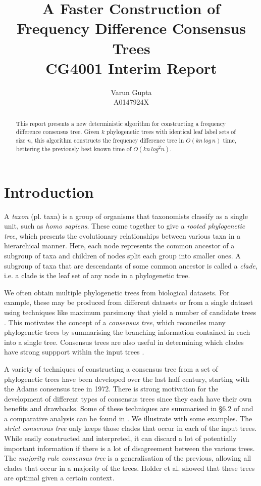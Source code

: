 \documentclass{article}
\title{A Faster Construction of Frequency Difference Consensus Trees\\CG4001 Interim Report}
\author{Varun Gupta\\A0147924X}
\begin{document}
    \maketitle

    \begin{abstract}
        This report presents a new deterministic algorithm for constructing a frequency difference consensus tree. Given $k$ phylogenetic trees with identical leaf label sets of size $n$, this algorithm constructs the frequency difference tree in $O(kn\,log\,n)$ time, bettering the previously best known time of $O(kn\,log^2n)$.
    \end{abstract}

    \section{Introduction}
    \label{sec:introduction}

    A \textit{taxon} (pl. taxa) is a group of organisms that taxonomists classify as a single unit, such as \textit{homo sapiens}. These come together to give a \textit{rooted phylogenetic tree}, which presents the evolutionary relationships between various taxa in a hierarchical manner. Here, each node represents the common ancestor of a subgroup of taxa and children of nodes split each group into smaller ones. A subgroup of taxa that are descendants of some common ancestor is called a \textit{clade}, i.e. a clade is the leaf set of any node in a phylogenetic tree.

    We often obtain multiple phylogenetic trees from biological datasets. For example, these may be produced from different datasets or from a single dataset using techniques like maximum parsimony that yield a number of candidate trees \cite{bryant1997hunting}. This motivates the concept of a \textit{consensus tree}, which reconciles many phylogenetic trees by summarising the branching information contained in each into a single tree. Consensus trees are also useful in determining which clades have strong suppport within the input trees \cite{felsenstein2004inferring}.

    A variety of techniques of constructing a consensus tree from a set of phylogenetic trees have been developed over the last half century, starting with the Adams consensus tree \cite{adams1972consensus} in 1972. There is strong motivation for the development of different types of consensus trees since they each have their own benefits and drawbacks. Some of these techniques are summarised in \S 6.2 of \cite{bryant1997hunting} and a comparative analysis can be found in \cite{bryant2003classification}. We illustrate with some examples. The \textit{strict consensus tree} \cite{sokal1981taxonomic} only keeps those clades that occur in each of the input trees. While easily constructed and interpreted, it can discard a lot of potentially important information if there is a lot of disagreement between the various trees. The \textit{majority rule consensus tree} \cite{margush1981consensusn} is a generalisation of the previous, allowing all clades that occur in a majority of the trees. Holder et al. \cite{holder2008justification} showed that these trees are optimal given a certain context.
\end{document}
